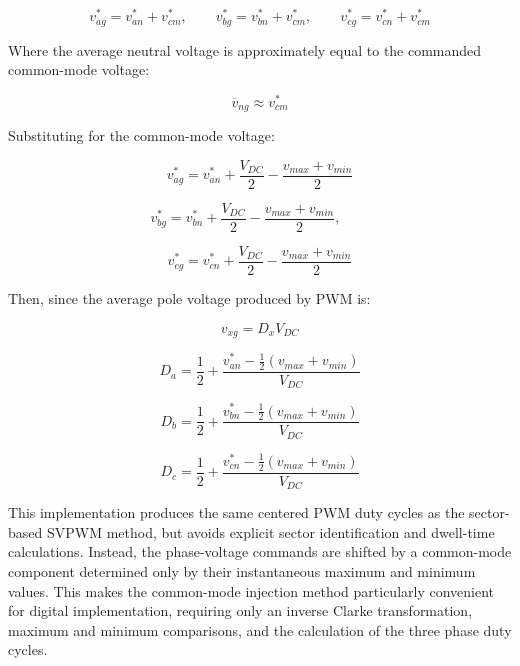 \documentclass{article}
\begin{document}
\begin{equation}
    v_{ag}^* = v_{an}^* + v_{cm}^*, \qquad
    v_{bg}^* = v_{bn}^* + v_{cm}^*, \qquad
    v_{cg}^* = v_{cn}^* + v_{cm}^*
\end{equation}

Where the average neutral voltage is approximately equal to the commanded common-mode voltage:

\begin{equation}
    \overline{v}_{ng} \approx v_{cm}^*
\end{equation}

Substituting for the common-mode voltage:

\begin{equation}
    v_{ag}^* = v_{an}^* + \frac{V_{DC}}{2} - \frac{v_{max} + v_{min}}{2}
\end{equation}

\begin{equation}
    v_{bg}^* = v_{bn}^* + \frac{V_{DC}}{2} - \frac{v_{max} + v_{min}}{2}, \qquad
\end{equation}

\begin{equation}
    v_{cg}^* = v_{cn}^* + \frac{V_{DC}}{2} - \frac{v_{max} + v_{min}}{2}
\end{equation}

Then, since the average pole voltage produced by PWM is:

\begin{equation}
    v_{xg} = D_xV_{DC}
\end{equation}

\begin{equation}
    D_a = \frac{1}{2} + \frac{v_{an}^* - \frac{1}{2}(v_{max} + v_{min})}{V_{DC}}
\end{equation}

\begin{equation}
    D_b = \frac{1}{2} + \frac{v_{bn}^* - \frac{1}{2}(v_{max} + v_{min})}{V_{DC}}
\end{equation}

\begin{equation}
    D_c = \frac{1}{2} + \frac{v_{cn}^* - \frac{1}{2}(v_{max} + v_{min})}{V_{DC}}
\end{equation}

This implementation produces the same centered PWM duty cycles as the sector-based SVPWM method, but avoids explicit sector identification and dwell-time calculations. Instead, the phase-voltage commands are shifted by a common-mode component determined only by their instantaneous maximum and minimum values. This makes the common-mode injection method particularly convenient for digital implementation, requiring only an inverse Clarke transformation, maximum and minimum comparisons, and the calculation of the three phase duty cycles.
\end{document}
